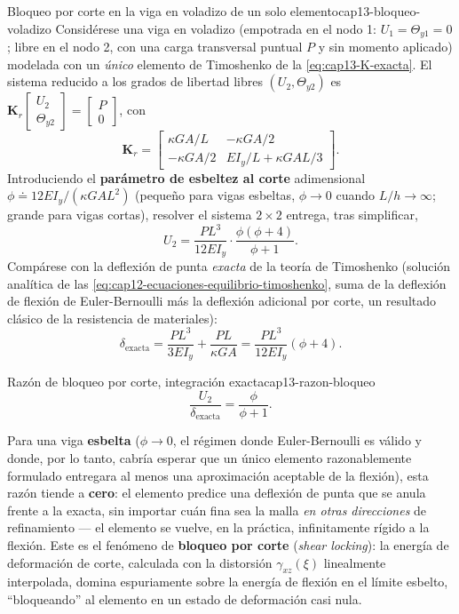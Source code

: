 \begin{ejemplo}{Bloqueo por corte en la viga en voladizo de un solo elemento}{cap13-bloqueo-voladizo}
Considérese una viga en voladizo (empotrada en el nodo 1: $U_1=\Theta_{y1}=0$; libre en el nodo 2, con una carga transversal puntual $P$ y sin momento aplicado) modelada con un \emph{único} elemento de Timoshenko de la \cref{eq:cap13-K-exacta}. El sistema reducido a los grados de libertad libres $(U_2,\Theta_{y2})$ es $\bm K_r\begin{bmatrix}U_2\\\Theta_{y2}\end{bmatrix}=\begin{bmatrix}P\\0\end{bmatrix}$, con
\[
\bm K_r = \begin{bmatrix} \kappa GA/L & -\kappa GA/2 \\ -\kappa GA/2 & EI_y/L+\kappa GAL/3 \end{bmatrix} .
\]
Introduciendo el \textbf{parámetro de esbeltez al corte} adimensional $\phi\doteq12EI_y/(\kappa GAL^2)$ (pequeño para vigas esbeltas, $\phi\to0$ cuando $L/h\to\infty$; grande para vigas cortas), resolver el sistema $2\times2$ entrega, tras simplificar,
\[
U_2 = \frac{PL^3}{12EI_y}\cdot\frac{\phi(\phi+4)}{\phi+1} .
\]
Compárese con la deflexión de punta \emph{exacta} de la teoría de Timoshenko (solución analítica de las \cref{eq:cap12-ecuaciones-equilibrio-timoshenko}, suma de la deflexión de flexión de Euler-Bernoulli más la deflexión adicional por corte, un resultado clásico de la resistencia de materiales):
\[
\delta_{\text{exacta}} = \frac{PL^3}{3EI_y} + \frac{PL}{\kappa GA} = \frac{PL^3}{12EI_y}\left(\phi+4\right) .
\]

\begin{ecnimportante}{Razón de bloqueo por corte, integración exacta}{cap13-razon-bloqueo}
\[
\frac{U_2}{\delta_{\text{exacta}}} = \frac{\phi}{\phi+1} .
\]
\end{ecnimportante}

Para una viga \textbf{esbelta} ($\phi\to0$, el régimen donde Euler-Bernoulli es válido y donde, por lo tanto, cabría esperar que un único elemento razonablemente formulado entregara al menos una aproximación aceptable de la flexión), esta razón tiende a \textbf{cero}: el elemento predice una deflexión de punta que se anula frente a la exacta, sin importar cuán fina sea la malla \emph{en otras direcciones} de refinamiento --- el elemento se vuelve, en la práctica, infinitamente rígido a la flexión. Este es el fenómeno de \textbf{bloqueo por corte} (\emph{shear locking}): la energía de deformación de corte, calculada con la distorsión $\gamma_{xz}(\xi)$ linealmente interpolada, domina espuriamente sobre la energía de flexión en el límite esbelto, ``bloqueando'' al elemento en un estado de deformación casi nula.
\end{ejemplo}

